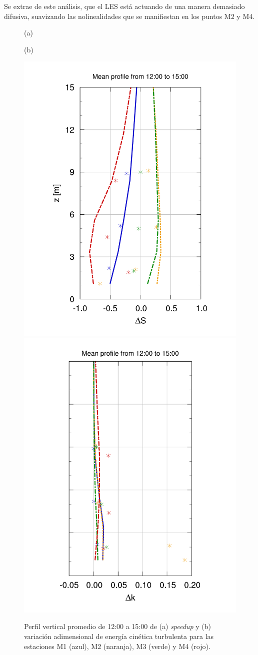 Se extrae de este análisis, que el LES está actuando de una manera demasiado difusiva, suavizando las nolinealidades que se manifiestan en los puntos M2 y M4.
\begin{figure}[H]
	\begin{minipage}{0.5\linewidth}
		\centering
		\hspace{7mm}(a)\end{minipage}%
	\begin{minipage}{0.5\linewidth}
		\centering
		\hspace{-5mm}(b)\end{minipage}%
	
	\centering
	\includegraphics[height=0.75\linewidth,page=1,trim={28mm 10mm 25mm 23mm},clip]{Imagenes/06/bol/V_masts}%
	\includegraphics[height=0.75\linewidth,page=1,trim={30mm 10mm 17mm 20mm},clip]{Imagenes/06/bol/k_masts}%
	\vspace{-2mm}\caption{Perfil vertical promedio de 12:00 a 15:00 de (a) \emph{speedup} y (b) variación adimensional de energía cinética turbulenta para las estaciones M1 (azul), M2 (naranja), M3 (verde) y M4 (rojo).}
	\label{fig:06_bol_mast_tke_speedup}
\end{figure}


